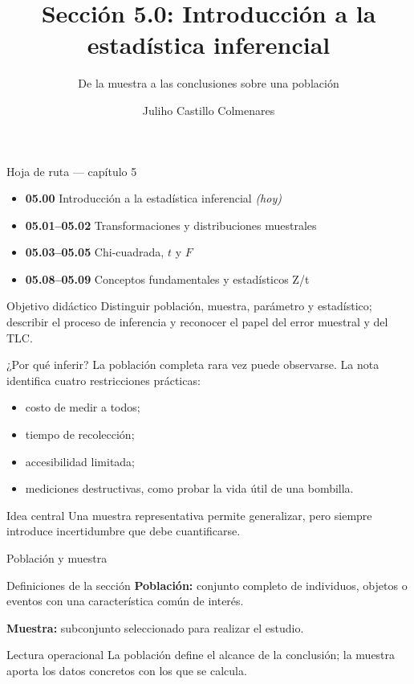 \documentclass[10pt,aspectratio=169]{beamer}
\title[Introducción a la estadística inferencial]{Sección 5.0: Introducción a la estadística inferencial}
\subtitle{De la muestra a las conclusiones sobre una población}
\author[J. Castillo Colmenares]{Juliho Castillo Colmenares}
\institute{Tecnológico de Monterrey}
\date{}
\begin{document}
\begin{frame}[plain]\vspace{-0.8cm}\titlepage\end{frame}

\begin{frame}{Hoja de ruta --- capítulo 5}
  \footnotesize
  \begin{itemize}\itemsep=0.08cm
    \item \textbf{05.00} Introducción a la estadística inferencial \emph{(hoy)}
    \item \textbf{05.01--05.02} Transformaciones y distribuciones muestrales
    \item \textbf{05.03--05.05} Chi-cuadrada, $t$ y $F$
    \item \textbf{05.08--05.09} Conceptos fundamentales y estadísticos Z/t
  \end{itemize}
  \begin{block}{Objetivo didáctico}
    Distinguir población, muestra, parámetro y estadístico; describir el proceso
    de inferencia y reconocer el papel del error muestral y del TLC.
  \end{block}
\end{frame}

\begin{frame}{¿Por qué inferir?}
  \footnotesize
  La población completa rara vez puede observarse. La nota identifica cuatro
  restricciones prácticas:
  \begin{itemize}\itemsep=0.1cm
    \item costo de medir a todos;
    \item tiempo de recolección;
    \item accesibilidad limitada;
    \item mediciones destructivas, como probar la vida útil de una bombilla.
  \end{itemize}
  \pause
  \begin{alertblock}{Idea central}
    Una muestra representativa permite generalizar, pero siempre introduce
    incertidumbre que debe cuantificarse.
  \end{alertblock}
\end{frame}

\begin{frame}{Población y muestra}
  \footnotesize
  \begin{block}{Definiciones de la sección}
    \textbf{Población:} conjunto completo de individuos, objetos o eventos con
    una característica común de interés.

    \medskip
    \textbf{Muestra:} subconjunto seleccionado para realizar el estudio.
  \end{block}
  \pause
  \begin{exampleblock}{Lectura operacional}
    La población define el alcance de la conclusión; la muestra aporta los
    datos concretos con los que se calcula.
  \end{exampleblock}
\end{frame}
\end{document}
